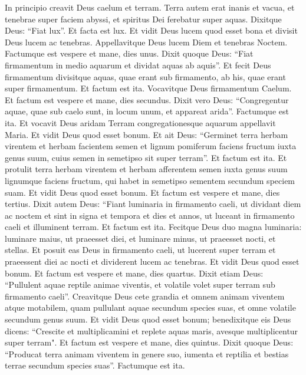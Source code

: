 
\begin{biblechapter}  
\verse In principio creavit Deus caelum et terram. 
\verse Terra autem erat inanis et vacua, et tenebrae super faciem abyssi, et spiritus Dei ferebatur super aquas. 
\verse Dixitque Deus: “Fiat lux”. Et facta est lux. 
\verse Et vidit Deus lucem quod esset bona et divisit Deus lucem ac tenebras. 
\verse Appellavitque Deus lucem Diem et tenebras Noctem. Factumque est vespere et mane, dies unus. 
\verse Dixit quoque Deus: “Fiat firmamentum in medio aquarum et dividat aquas ab aquis”. 
\verse Et fecit Deus firmamentum divisitque aquas, quae erant sub firmamento, ab his, quae erant super firmamentum. Et factum est ita. 
\verse Vocavitque Deus firmamentum Caelum. Et factum est vespere et mane, dies secundus. 
\verse Dixit vero Deus: “Congregentur aquae, quae sub caelo sunt, in locum unum, et appareat arida”. Factumque est ita. 
\verse Et vocavit Deus aridam Terram congregationesque aquarum appellavit Maria. Et vidit Deus quod esset bonum.  
\verse Et ait Deus: “Germinet terra herbam virentem et herbam facientem semen et lignum pomiferum faciens fructum iuxta genus suum, cuius semen in semetipso sit super terram”. Et factum est ita. 
\verse Et protulit terra herbam virentem et herbam afferentem semen iuxta genus suum lignumque faciens fructum, qui habet in semetipso sementem secundum speciem suam. Et vidit Deus quod esset bonum. 
\verse Et factum est vespere et mane, dies tertius. 
\verse Dixit autem Deus: “Fiant luminaria in firmamento caeli, ut dividant diem ac noctem et sint in signa et tempora et dies et annos, 
\verse ut luceant in firmamento caeli et illuminent terram. Et factum est ita. 
\verse Fecitque Deus duo magna luminaria: luminare maius, ut praeesset diei, et luminare minus, ut praeesset nocti, et stellas. 
\verse Et posuit eas Deus in firmamento caeli, ut lucerent super terram 
\verse et praeessent diei ac nocti et dividerent lucem ac tenebras. Et vidit Deus quod esset bonum. 
\verse Et factum est vespere et mane, dies quartus. 
\verse Dixit etiam Deus: “Pullulent aquae reptile animae viventis, et volatile volet super terram sub firmamento caeli”. 
\verse Creavitque Deus cete grandia et omnem animam viventem atque motabilem, quam pullulant aquae secundum species suas, et omne volatile secundum genus suum. Et vidit Deus quod esset bonum; 
\verse benedixitque eis Deus dicens: “Crescite et multiplicamini et replete aquas maris, avesque multiplicentur super terram". 
\verse Et factum est vespere et mane, dies quintus. 
\verse Dixit quoque Deus: “Producat terra animam viventem in genere suo, iumenta et reptilia et bestias terrae secundum species suas”. Factumque est ita. 

\end{biblechapter}
